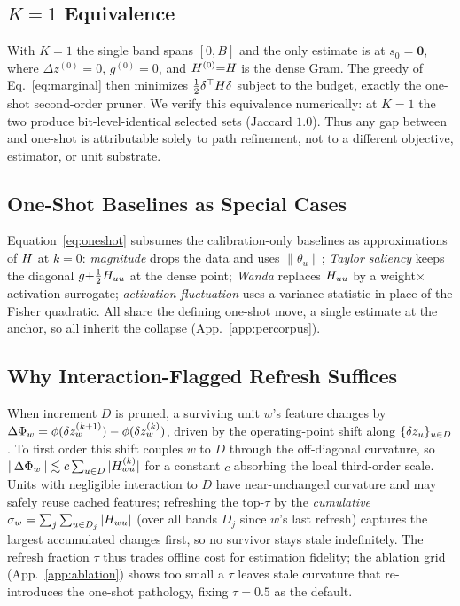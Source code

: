 \subsection{$K{=}1$ Equivalence}
\label{app:k1}
With $K{=}1$ the single band spans $[0,B]$ and the only estimate is at $s_0{=}\mathbf 0$, where
$\Delta z^{(0)}{=}0$, $g^{(0)}{=}0$, and $H^{(0)}{=}H$ is the dense Gram. The greedy of
Eq.~\eqref{eq:marginal} then minimizes $\tfrac12\delta^\top H\delta$ subject to the budget, exactly
the one-shot second-order pruner. We verify this equivalence numerically: at $K{=}1$ the two produce
bit-level-identical selected sets (Jaccard $1.0$). Thus any gap between \method and one-shot is attributable solely to
path refinement, not to a different objective, estimator, or unit substrate.

\subsection{One-Shot Baselines as Special Cases}
\label{app:special}
Equation~\eqref{eq:oneshot} subsumes the calibration-only baselines as approximations of $H$ at
$k{=}0$: \emph{magnitude} drops the data and uses $\|\theta_u\|$; \emph{Taylor saliency}
\citep{molchanov2019taylor,ma2023llmpruner} keeps the diagonal $g{+}\tfrac12H_{uu}$ at the dense
point; \emph{Wanda} \citep{sun2024wanda} replaces $H_{uu}$ by a weight$\times$activation
surrogate; \emph{activation-fluctuation} \citep{an2024flap} uses a variance statistic in place of the
Fisher quadratic. All share the defining one-shot move, a single estimate at the anchor, so all
inherit the collapse (App.~\ref{app:percorpus}).

\subsection{Why Interaction-Flagged Refresh Suffices}
\label{app:staleness}
When increment $D$ is pruned, a surviving unit $w$'s feature changes by
$\Delta\Phi_w=\phi(\delta z_w^{(k{+}1)})-\phi(\delta z_w^{(k)})$, driven by the operating-point shift along
$\{\delta z_u\}_{u\in D}$. To first order this shift couples $w$ to $D$ through the off-diagonal curvature,
so $\left\lVert \Delta\Phi_w \right\rVert\lesssim c\sum_{u\in D}|H^{(k)}_{wu}|$ for a constant $c$ absorbing the
local third-order scale. Units with negligible interaction to $D$ have near-unchanged curvature and
may safely reuse cached features; refreshing the top-$\tau$ by the \emph{cumulative}
$\sigma_w=\sum_{j}\sum_{u\in D_j}|H_{wu}|$ (over all bands $D_j$ since $w$'s last refresh)
captures the largest accumulated changes first, so no survivor stays stale indefinitely. The refresh fraction $\tau$ thus trades offline cost for
estimation fidelity; the ablation grid (App.~\ref{app:ablation}) shows too small a $\tau$ leaves stale
curvature that re-introduces the one-shot pathology, fixing $\tau{=}0.5$ as the default.

